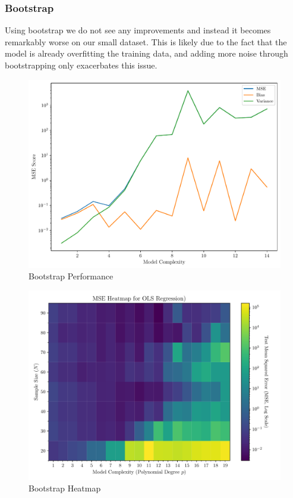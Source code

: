 \documentclass[amssymb,twocolumn,aps]{revtex4}
\begin{document}
\subsubsection{Bootstrap}
Using bootstrap we do not see any improvements and instead it becomes remarkably worse on our small dataset.
This is likely due to the fact that the model is already overfitting the training data, and adding more noise through bootstrapping only exacerbates this issue.


\begin{figure}[h]
    \centering
    \includegraphics[width=.95 \linewidth]{Figures/Bootstrap_performance.pdf}
    \caption{Bootstrap Performance}
    \label{fig:BootstrapPerformance}
\end{figure}


\begin{figure}[h]
    \centering
    \includegraphics[width=.95 \linewidth]{Figures/Bootstrap_Heatmap.pdf}
    \caption{Bootstrap Heatmap }
    \label{fig:BootstrapHeatmap}
\end{figure}
\end{document}
